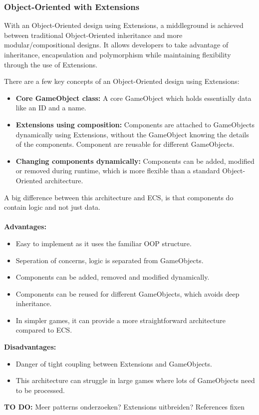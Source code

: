\subsubsection{Object-Oriented with Extensions}
With an Object-Oriented design using Extensions, a middleground is achieved between traditional Object-Oriented inheritance and more modular/compositional designs.
It allows developers to take advantage of inheritance, encapsulation and polymorphism while maintaining flexibility through the use of Extensions.

\noindent There are a few key concepts of an Object-Oriented design using Extensions:
\begin{itemize}
      \item \textbf{Core GameObject class:}
            A core GameObject which holds essentially data like an ID and a name.
      \item \textbf{Extensions using composition:}
            Components are attached to GameObjects dynamically using Extensions, without the GameObject knowing the details of the components.
            Component are reusable for different GameObjects.
      \item \textbf{Changing components dynamically:}
            Components can be added, modified or removed during runtime, which is more flexible than a standard Object-Oriented architecture. 
\end{itemize}

\noindent A big difference between this architecture and ECS, is that components do contain logic and not just data.
\\\\
\noindent \textbf{Advantages:}
\begin{itemize}
      \item Easy to implement as it uses the familiar OOP structure.
      \item Seperation of concerns, logic is separated from GameObjects.
      \item Components can be added, removed and modified dynamically.
      \item Components can be reused for different GameObjects, which avoids deep inheritance.
      \item In simpler games, it can provide a more straightforward architecture compared to ECS.
\end{itemize}

\noindent \textbf{Disadvantages:}
\begin{itemize}
      \item Danger of tight coupling between Extensions and GameObjects.
      \item This architecture can struggle in large games where lots of GameObjects need to be processed.
\end{itemize}

\textbf{TO DO:}
Meer patterns onderzoeken?
Extensions uitbreiden?
References fixen
